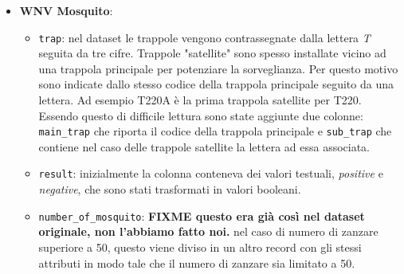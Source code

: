 \begin{itemize}
\begin{itemize}
            \item \texttt{stn\_pressure}, \texttt{sea\_level}: i valori di 
                pressione sono stati convertiti da pollici di mercurio (inHg) a 
                millimetri di mercurio (mmHg).

            \item \texttt{result\_speed}, \texttt{avg\_speed}, \texttt{max5\_speed}, 
            	\texttt{max2\_speed}: i valori di velocità sono stati convertiti da
            	miglia orarie (mph) a chilometri orari 
            	(\si[per-mode=symbol]{\km\per\hour}).
            
            \item \texttt{code\_sum}: questo attributo corrisponde ad una lista di 
            	codici che possono essere assegnati a ciascuna rilevazione, 
            	corrispondenti ai diversi tipi di precipitazioni e altri fenomeni
            	meteorologici (ad es. pioggia, neve, nebbia, \dots). Dato che a 
            	ciascuna rilevazione può essere assegnato più di un codice, è stato
            	necessario effettuare un parsing dei valori, creando una colonna per
				ogni codice utilizzato.
        \end{itemize}
	
	\item \textbf{WNV Mosquito}:
	
	\begin{itemize}
		
		\item \texttt{trap}: nel dataset le trappole vengono contrassegnate 
		dalla lettera \textit{T} seguita da tre cifre. Trappole "satellite" 
		sono spesso installate vicino ad una trappola principale per potenziare 
		la sorveglianza. Per questo motivo sono indicate dallo stesso codice 
		della trappola principale seguito da una lettera. Ad esempio T220A è la 
		prima trappola satellite per T220. Essendo questo di difficile lettura 
		sono state aggiunte due colonne: \texttt{main\_trap} che riporta il 
		codice della trappola principale e \texttt{sub\_trap} che contiene nel 
		caso delle trappole satellite la lettera ad essa associata.
		
		\item \texttt{result}: inizialmente la colonna conteneva dei valori  
		testuali, \textit{positive} e \textit{negative}, che sono stati 
		trasformati in valori booleani.  
		
		\item \texttt{number\_of\_mosquito}: \textbf{FIXME questo era già così 
		nel dataset originale, non l'abbiamo fatto noi.} nel caso di numero di 
		zanzare superiore a 50, questo viene diviso in un altro record con gli 
		stessi attributi in modo tale che il numero di zanzare sia limitato a 
		50.  


\end{itemize}
\end{itemize}
